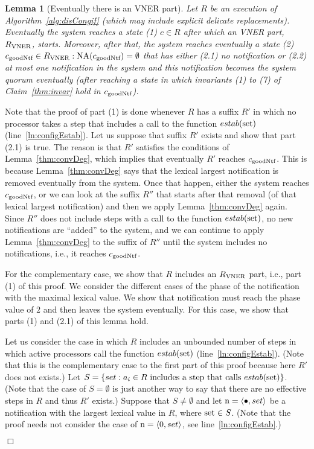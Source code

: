 \documentclass[11pt]{article}
\newcommand{\configEstab}{estab}
\newtheorem{lemma}[theorem]{Lemma}
\newenvironment{proof}{\noindent{\bf Proof.}}{\hfill$\Box$}
\begin{document}
\begin{lemma}[Eventually there is an VNER part]
\label{thm:virtuallyNotExplicit}
Let $R$ be an execution of Algorithm~\ref{alg:disCongif} (which may include explicit delicate replacements). Eventually the system reaches a state (1) $c \in R$ after which an VNER part, $R_{\textnormal{VNER}}$, starts. Moreover, after that, the system reaches eventually a state (2) $c_{\textnormal{goodNtf}} \in R_{\textnormal{VNER}} :\textnormal{NA}(c_{\textnormal{goodNtf}})=\emptyset$ that has either (2.1) no notification or (2.2) at most one notification in the system and this notification becomes the system quorum eventually (after reaching a state in which invariants (1) to (7) of Claim~\ref{thm:invar} hold in $c_{\textnormal{goodNtf}}$). 
\end{lemma}
\begin{proof}
Note that the proof of part (1) is done whenever $R$ has a suffix $R'$ in which no processor takes a step that includes a call to the function $\configEstab(\textnormal{set})$ (line~\ref{ln:configEstab}). Let us suppose that suffix $R'$ exists and show that part (2.1) is true. The reason is that $R'$ satisfies the conditions of Lemma~\ref{thm:convDeg}, which implies that eventually $R'$ reaches $c_{\textnormal{goodNtf}}$. This is because Lemma~\ref{thm:convDeg} says that the lexical largest notification is removed eventually from the system. Once that happen, either the system reaches $c_{\textnormal{goodNtf}}$, or we can look at the suffix $R''$ that starts after that removal (of that lexical largest notification) and then we apply Lemma~\ref{thm:convDeg} again. Since $R''$ does not include steps with a call to the function $\configEstab(\textnormal{set})$, no new notifications are ``added'' to the system, and we can continue to apply Lemma~\ref{thm:convDeg} to the suffix of $R''$ until the system includes no notifications, i.e., it reaches $c_{\textnormal{goodNtf}}$.



For the complementary case, we show that $R$ includes an $R_{\textnormal{VNER}}$ part, i.e., part (1) of this proof. We consider the different cases of the phase of the notification with the maximal lexical value. We show that notification must reach the phase value of $2$ and then leaves the system eventually. For this case, we show that parts (1) and (2.1) of this lemma hold.    

Let us consider the case in which $R$ includes an unbounded number of steps in which active processors call the function $\configEstab(\textnormal{set})$ (line~\ref{ln:configEstab}).
(Note that this is the  complementary case to the first part of this proof because here $R'$ does not exists.) Let $S = \{ set :  a_i \in R \textnormal{ includes a step that calls }  \configEstab(\textnormal{set})\}$.
(Note that the case of $S = \emptyset$ is just another way to say that there are no effective steps in $R$ and thus $R'$ exists.)
Suppose that $S \neq \emptyset$ and let $\textnormal{n} = \langle \bullet, set \rangle$ be a notification with the largest lexical value in $R$, where $\textnormal{set} \in S$. (Note that the proof needs not consider the case of $\textnormal{n} = \langle 0, set \rangle$, see line~\ref{ln:configEstab}.)


\end{proof}
\end{document}

